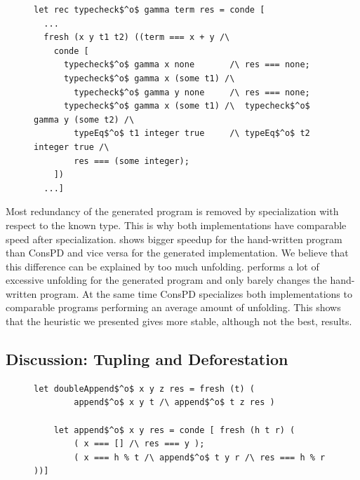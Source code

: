 \begin{figure}[!t]
  \centering
    \begin{lstlisting}[label={type:gen}, caption={A fragment of the generated typechecker}, captionpos=b, frame=tb]
let rec typecheck$^o$ gamma term res = conde [
  ...
  fresh (x y t1 t2) ((term === x + y /\
    conde [
      typecheck$^o$ gamma x none       /\ res === none;
      typecheck$^o$ gamma x (some t1) /\
        typecheck$^o$ gamma y none     /\ res === none;
      typecheck$^o$ gamma x (some t1) /\  typecheck$^o$ gamma y (some t2) /\
        typeEq$^o$ t1 integer true     /\ typeEq$^o$ t2 integer true /\
        res === (some integer);
    ])
  ...]
    \end{lstlisting}
\end{figure}

Most redundancy of the generated program is removed by specialization with respect to the known type.
This is why both implementations have comparable speed after specialization.
\ecce shows bigger speedup for the hand-written program than ConsPD and vice versa for the generated implementation.
We believe that this difference can be explained by too much unfolding.
\ecce performs a lot of excessive unfolding for the generated program and only barely changes the hand-written program.
At the same time ConsPD specializes both implementations to comparable programs performing an average amount of unfolding.
This shows that the heuristic we presented gives more stable, although not the best, results.


\subsection{Discussion: Tupling and Deforestation}
\label{discussion}


\begin{figure}[!t]
  \centering
  \begin{minipage}{0.7\textwidth}
    \begin{lstlisting}[label={doubleApp}, caption={Inefficient implementation of concatenation of three lists}, captionpos=b, frame=tb]
    let doubleAppend$^o$ x y z res = fresh (t) (
        append$^o$ x y t /\ append$^o$ t z res )

    let append$^o$ x y res = conde [ fresh (h t r) (
        ( x === [] /\ res === y );
        ( x === h % t /\ append$^o$ t y r /\ res === h % r ))]
    \end{lstlisting}
  \end{minipage}
\end{figure}

